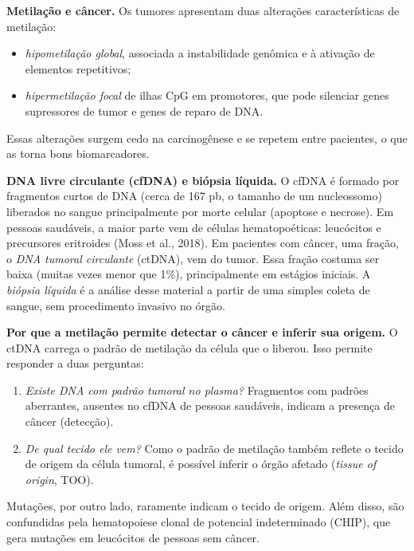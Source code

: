 \documentclass[11pt,a4paper]{article}
\providecommand{\tightlist}{\setlength{\itemsep}{0pt}\setlength{\parskip}{0pt}}
\begin{document}
\textbf{Metilação e câncer.} Os tumores apresentam duas alterações
características de metilação:

\begin{itemize}
\tightlist
\item
  \emph{hipometilação global}, associada a instabilidade genômica e à ativação
  de elementos repetitivos;
\item
  \emph{hipermetilação focal} de ilhas CpG em promotores, que pode silenciar
  genes supressores de tumor e genes de reparo de DNA.
\end{itemize}

Essas alterações surgem cedo na carcinogênese e se repetem entre pacientes, o
que as torna bons biomarcadores.

\textbf{DNA livre circulante (cfDNA) e biópsia líquida.} O cfDNA é formado por
fragmentos curtos de DNA (cerca de 167 pb, o tamanho de um nucleossomo)
liberados no sangue principalmente por morte celular (apoptose e necrose). Em
pessoas saudáveis, a maior parte vem de células hematopoéticas: leucócitos e
precursores eritroides (Moss et al., 2018). Em pacientes com câncer, uma fração,
o \emph{DNA tumoral circulante} (ctDNA), vem do tumor. Essa fração costuma ser
baixa (muitas vezes menor que 1\%), principalmente em estágios iniciais. A
\emph{biópsia líquida} é a análise desse material a partir de uma simples coleta
de sangue, sem procedimento invasivo no órgão.

\textbf{Por que a metilação permite detectar o câncer e inferir sua origem.} O
ctDNA carrega o padrão de metilação da célula que o liberou. Isso permite
responder a duas perguntas:

\begin{enumerate}
\def\labelenumi{\arabic{enumi}.}
\tightlist
\item
  \emph{Existe DNA com padrão tumoral no plasma?} Fragmentos com padrões
  aberrantes, ausentes no cfDNA de pessoas saudáveis, indicam a presença de
  câncer (detecção).
\item
  \emph{De qual tecido ele vem?} Como o padrão de metilação também reflete o
  tecido de origem da célula tumoral, é possível inferir o órgão afetado
  (\emph{tissue of origin}, TOO).
\end{enumerate}

Mutações, por outro lado, raramente indicam o tecido de origem. Além disso, são
confundidas pela hematopoiese clonal de potencial indeterminado (CHIP), que gera
mutações em leucócitos de pessoas sem câncer.
\end{document}
